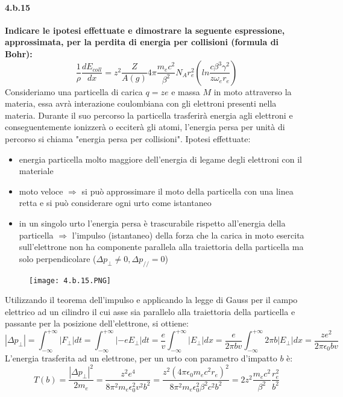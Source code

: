 \documentclass[twoside]{article}
\begin{document}
\paragraph{4.b.15}\textbf{Indicare le ipotesi effettuate e dimostrare la seguente espressione, approssimata, per la perdita di energia per collisioni (formula di Bohr):
\[
\frac{1}{\rho}\frac{dE_{coll}}{dx}= z^2\frac{Z}{A(g)} 4\pi \frac{m_e c^2}{\beta^2}N_A r_e^2\left(ln\frac{c\beta^3\gamma^2}{z\omega_e r_e} \right)
\]
}
Consideriamo una particella di carica $q=ze$ e massa $M$ in moto attraverso la materia, essa avrà interazione coulombiana con gli elettroni presenti nella materia. Durante il suo percorso la particella trasferirà energia agli elettroni e conseguentemente ionizzerà o ecciterà gli atomi, l'energia persa per unità di percorso si chiama "energia persa per collisioni". 
Ipotesi effettuate:
\begin{itemize}
    \item energia particella molto maggiore dell'energia di legame degli elettroni con il materiale
    \item moto veloce $\Rightarrow$ si può approssimare il moto della particella con una linea retta e si può considerare ogni urto come istantaneo
    \item in un singolo urto l'energia persa è trascurabile rispetto all'energia della particella $\Rightarrow$ l'impulso (istantaneo) della forza che la carica in moto esercita sull'elettrone non ha componente parallela alla traiettoria della particella ma solo perpendicolare ($\Delta p_{\perp}\not=0, \Delta p_{//}=0 $)
\end{itemize}
\begin{figure}[H]
    \centering
    \texttt{[image: 4.b.15.PNG]}
\end{figure}
Utilizzando il teorema dell'impulso e applicando la legge di Gauss per il campo elettrico ad un cilindro il cui asse sia parallelo alla traiettoria della particella e passante per la posizione dell'elettrone, si ottiene:
\begin{equation*}
    |\Delta p_{\perp}|=\int_{-\infty}^{+\infty}|F_{\perp}|dt=\int_{-\infty}^{+\infty}|-eE_{\perp}|dt=\frac{e}{v}\int_{-\infty}^{+\infty}|E_{\perp}|dx= \frac{e}{2\pi bv} \int_{-\infty}^{+\infty}2 \pi b|E_{\perp}|dx= \frac{ze^2}{2\pi \epsilon_0 b v}
\end{equation*}
L'energia trasferita ad un elettrone, per un urto con parametro d'impatto $b$ è:
\begin{equation*}
    T(b)=\frac{|\Delta p_{\perp}|^2}{2 m_e}=\frac{z^2 e^4}{8 \pi^2 m_e \epsilon_0^2 v^2 b^2}=\frac{z^2(4\pi \epsilon_0 m_e c^2 r_e)^2}{8 \pi^2 m_e \epsilon_0^2\beta^2c^2b^2} = 2z^2 \frac{m_e c^2}{\beta^2}\frac{r_e^2}{b^2}
\end{equation*}
\end{document}
